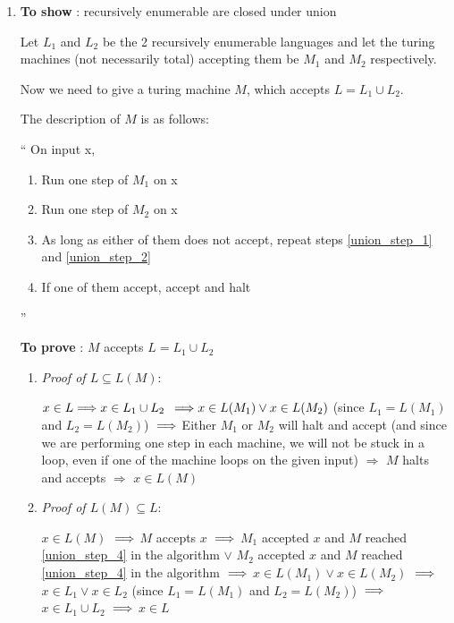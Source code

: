 \newcommand{\re}{recursively enumerable }
\begin{enumerate}
\item \textbf{To show} : \re are closed under union
    
    Let $L_1$ and $L_2$ be the 2 \re languages and let the turing machines (not necessarily total) accepting them be $M_1$ and $M_2$ respectively.

    Now we need to give a turing machine $M$, which accepts $ L = L_1 \cup L_2 $.

    The description of $M$ is as follows:

    ``
        On input x,
        \begin{enumerate}
            \item \label{union_step_1} Run one step of $M_1$ on x
            \item \label{union_step_2} Run one step of $M_2$ on x
            \item \label{union_step_3} As long as either of them does not accept, repeat steps \ref{union_step_1} and \ref{union_step_2}
            \item \label{union_step_4} If one of them accept, accept and halt
        \end{enumerate}
    ''

    \textbf{To prove} : $M$ accepts $L = L_1 \cup L_2$

    \begin{enumerate}
    \item \textit{Proof of $L \subseteq L(M)$}:
            
$ 
x \in L 
\newline
\Longrightarrow 
x \in L_1 \cup L_2
$
$
\newline
\Longrightarrow
x \in L(M_1) \lor x \in L(M_2)$
(since $L_1 = L(M_1)$ and $L_2 = L(M_2)$)
$
\newline
\Longrightarrow
$
Either $M_1$ or $M_2$ will halt and accept (and since we are performing one step in each machine, we will not be stuck in a loop, even if one of the machine loops on the given input)
\newline
$\Longrightarrow$
$M$ halts and accepts
\newline
$\Longrightarrow$
$ x \in L(M)$


\item \textit{Proof of $L(M) \subseteq L$}:

$x \in L(M)$
$
\newline
\Longrightarrow
$
$M$ accepts $x$
$
\newline
\Longrightarrow
$
$M_1$ accepted $x$ and $M$ reached \ref{union_step_4} in the algorithm 
\newline$\lor$ $M_2$ accepted $x$ and $M$ reached \ref{union_step_4} in the algorithm
$
\newline
\Longrightarrow
$
$x \in L(M_1) \lor x \in L(M_2)$
$
\newline
\Longrightarrow
$
$x \in L_1 \lor x \in L_2$ (since $L_1 = L(M_1)$ and $L_2 = L(M_2)$)
$
\newline
\Longrightarrow
$
$x \in L_1 \cup L_2$
$
\newline
\Longrightarrow
$
$x \in L$



\end{enumerate}
\end{enumerate}
